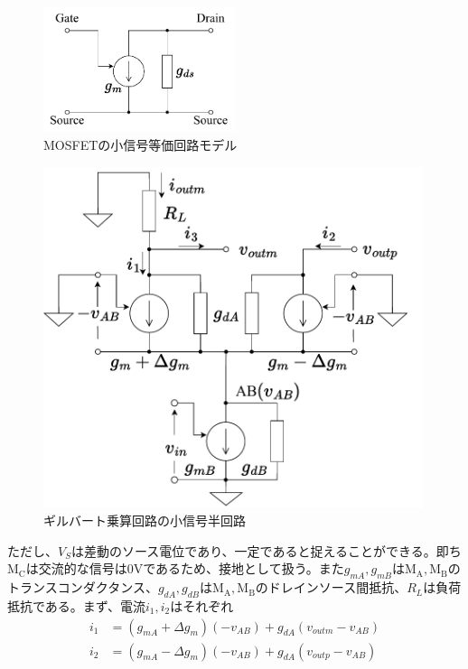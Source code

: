             \begin{figure}[!b]
                \centering
                \includegraphics[width=0.5\textwidth]{figures/chapter2/mos_eq.pdf}
                \caption{MOSFETの小信号等価回路モデル}
                \label{fig:2_moseq}
            \end{figure}
            \begin{figure}[!b]
                \centering
                \includegraphics[width=0.99\textwidth]{figures/chapter2/halfeq.pdf}
                \caption{ギルバート乗算回路の小信号半回路}
                \label{fig:2_half}
            \end{figure}
            \clearpage
            ただし、$V_{S}$は差動のソース電位であり、一定であると捉えることができる。即ち$\mathrm{M_{C}}$は交流的な信号は$0\mathrm{ V}$であるため、接地として扱う。また$g_{mA},g_{mB}$は$\mathrm{M_{A},M_{B}}$のトランスコンダクタンス、$g_{dA},g_{dB}$は$\mathrm{M_{A},M_{B}}$のドレインソース間抵抗、$R_{L}$は負荷抵抗である。まず、電流$i_{1},i_{2}$はそれぞれ
            \begin{align}
                i_{1}&=(g_{mA}+\Delta g_{m})(-v_{AB})+g_{dA}(v_{outm}-v_{AB})        \label{eq:2_i1}\\
                i_{2}&=(g_{mA}-\Delta g_{m})(-v_{AB})+g_{dA}(v_{outp}-v_{AB})        \label{eq:2_i2}
            \end{align}
